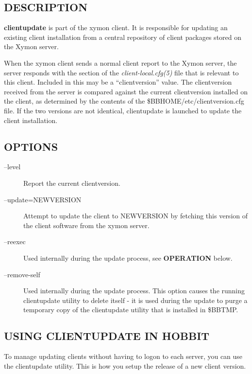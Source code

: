  
\subsection{DESCRIPTION}
\textbf{clientupdate}
 is part of the xymon client. It is responsible for updating an existing client installation from a central repository of client packages stored on the Xymon server. 

  When the xymon client sends a normal client report to the Xymon server, the server responds with the section of the \emph{client-local.cfg(5)}
 file that is relevant to this client. Included in this may be a ``clientversion'' value. The clientversion received from the server is compared against the current clientversion installed on the client, as determined by the contents of the \$BBHOME/etc/clientversion.cfg file. If the two versions are not identical, clientupdate is launched to update the client installation. 


 
\subsection{OPTIONS}
\begin{description}
\item[--level] Report the current clientversion. 

 

\item[--update=NEWVERSION] Attempt to update the client to NEWVERSION by fetching this version of the client software from the xymon server. 

 

\item[--reexec] Used internally during the update process, see \textbf{OPERATION}
 below. 

 

\item[--remove-self] Used internally during the update process. This option causes the running clientupdate utility to delete itself - it is used during the update to purge a temporary copy of the clientupdate utility that is installed in \$BBTMP. 

 


\end{description}
\subsection{USING CLIENTUPDATE IN HOBBIT}
 To manage updating clients without having to logon to each server, you can use the clientupdate utility. This is how you setup the release of a new client version. 

